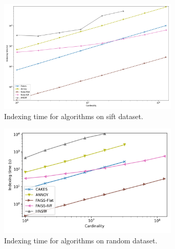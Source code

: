 \documentclass{article}
\begin{document}
\begin{figure}[ht!]
    \centering
    \includegraphics[width=3.4in]{plots/sift-indexing.png}
    \caption{
        Indexing time for algorithms on sift dataset. 
    }
    \label{fig:supplement:sift-indexing}
\end{figure}

\begin{figure}[ht!]
    \centering
    \includegraphics[width=3.4in]{plots/random-indexing.png}
    \caption{
        Indexing time for algorithms on random dataset. 
    }
    \label{fig:supplement:random-indexing}
\end{figure}
\end{document}
